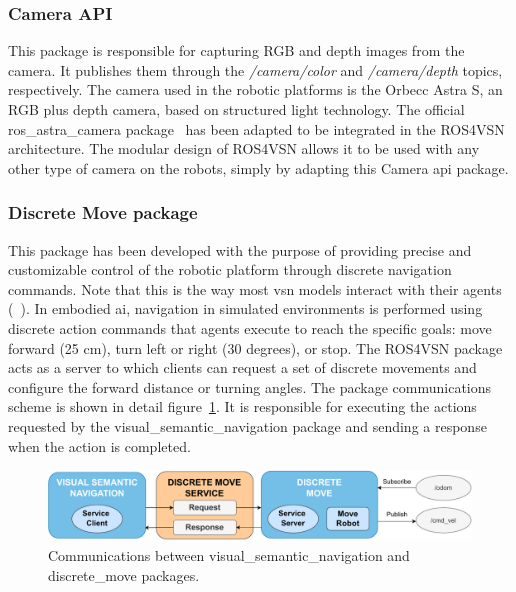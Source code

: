 \subsubsection{Camera API}\label{subsubsec:camera-api}

This package is responsible for capturing RGB and depth images from the camera.
It publishes them through the \textit{/camera/color} and \textit{/camera/depth} topics, respectively.
The camera used in the robotic platforms is the Orbecc Astra S, an RGB plus depth camera, based on structured light technology.
The official ros\_astra\_camera package~\cite{orbeccros} has been adapted to be integrated in the ROS4VSN architecture.
The modular design of ROS4VSN allows it to be used with any other type of camera on the robots, simply by adapting this Camera \acrshort{api} package.

\subsubsection{Discrete Move package}\label{subsubsec:discrete-move-package}

This package has been developed with the purpose of providing precise and customizable control of the robotic platform through discrete navigation commands.
Note that this is the way most \acrshort{vsn} models interact with their agents (\eg~\cite{ramrakhya2023,chang2020}).
In embodied \acrshort{ai}, navigation in simulated environments is performed using discrete action commands that agents execute to reach the specific goals: move forward (25 cm), turn left or right (30 degrees), or stop.
The ROS4VSN package acts as a server to which clients can request a set of discrete movements and configure the forward distance or turning angles.
The package communications scheme is shown in detail figure~\ref{fig:discrete_move}.
It is responsible for executing the actions requested by the visual\_semantic\_navigation package and sending a response when the action is completed.

\begin{figure}
    \centering
    \includegraphics[width=\linewidth]{figures/ros4vsn/comunicaciones_service}
    \caption{Communications between visual\_semantic\_navigation and discrete\_move packages.}
    \label{fig:discrete_move}
\end{figure}

